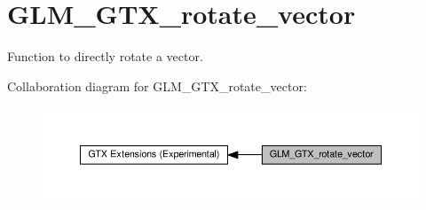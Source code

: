 \hypertarget{group__gtx__rotate__vector}{}\section{G\+L\+M\+\_\+\+G\+T\+X\+\_\+rotate\+\_\+vector}
\label{group__gtx__rotate__vector}


Function to directly rotate a vector.  


Collaboration diagram for G\+L\+M\+\_\+\+G\+T\+X\+\_\+rotate\+\_\+vector\+:\nopagebreak
\begin{figure}[H]
\begin{center}
\leavevmode
\includegraphics[width=350pt]{group__gtx__rotate__vector}
\end{center}
\end{figure}
